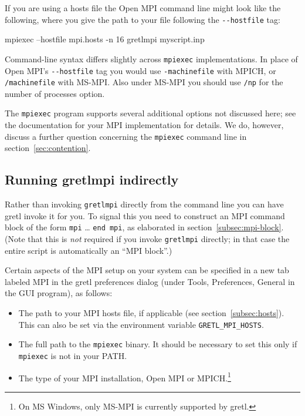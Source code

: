 \documentclass{article}
\def\mymbox{\leavevmode\hbox}
\begin{document}
If you are using a hosts file the \textsf{Open MPI} command line might
look like the following, where you give the path to your file
following the \verb|--hostfile| tag:
\begin{code}
mpiexec --hostfile mpi.hosts -n 16 gretlmpi myscript.inp
\end{code}

Command-line syntax differs slightly across \texttt{mpiexec}
implementations. In place of \textsf{Open MPI}'s
\mymbox{\verb|--hostfile|} tag you would use \verb|-machinefile| with
\textsf{MPICH}, or \verb|/machinefile| with \textsf{MS-MPI}. Also
under \textsf{MS-MPI} you should use \texttt{/np} for the number of
processes option.

The \texttt{mpiexec} program supports several additional options not
discussed here; see the documentation for your MPI implementation for
details. We do, however, discuss a further question concerning the
\texttt{mpiexec} command line in section~\ref{sec:contention}.

\subsection{Running gretlmpi indirectly}
\label{subsec:mpi-indirect}

Rather than invoking \texttt{gretlmpi} directly from the command
line you can have gretl invoke it for you. To signal this you need to
construct an MPI command block of the form \texttt{mpi} \dots{}
\texttt{end mpi}, as elaborated in
section~\ref{subsec:mpi-block}. (Note that this is \emph{not} required
if you invoke \texttt{gretlmpi} directly; in that case the entire
script is automatically an ``MPI block''.)

Certain aspects of the MPI setup on your system can be specified in a
new tab labeled \textsf{MPI} in the gretl preferences dialog (under
\textsf{Tools}, \textsf{Preferences}, \textsf{General} in the GUI
program), as follows:
\begin{itemize}
\item The path to your MPI hosts file, if applicable (see
  section~\ref{subsec:hosts}). This can also be set via the
  environment variable \verb|GRETL_MPI_HOSTS|.
\item The full path to the \texttt{mpiexec} binary. It should be
  necessary to set this only if \texttt{mpiexec} is not in your PATH.
\item The type of your MPI installation, \textsf{Open MPI} or
  \textsf{MPICH}.\footnote{On MS Windows, only \textsf{MS-MPI} is
    currently supported by gretl.}
\end{itemize}
\end{document}
